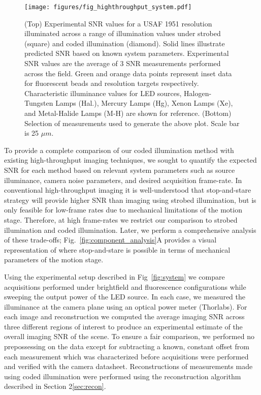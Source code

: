\begin{figure}
\centering
\texttt{[image: figures/fig\_highthroughput\_system.pdf]}
  \caption{\label{fig:experimental_comparison}(Top) Experimental SNR values for a USAF 1951 resolution illuminated across a range of illumination values under strobed (square) and coded illumination (diamond). Solid lines illustrate predicted SNR based on known system parameters. Experimental SNR values are the average of 3 SNR measurements performed across the field. Green and orange data points represent inset data for fluorescent beads and resolution targets respectively. Characteristic illuminance values for LED sources, Halogen-Tungsten Lamps (Hal.), Mercury Lamps (Hg), Xenon Lamps (Xe), and Metal-Halide Lamps (M-H) are shown for reference. (Bottom) Selection of measurements used to generate the above plot. Scale bar is 25 $\mu m$.}

\end{figure}

To provide a complete comparison of our coded illumination method with existing high-throughput imaging techniques, we sought to quantify the expected SNR for each method based on relevant system parameters such as source illuminance, camera noise parameters, and desired acquisition frame-rate. In conventional high-throughput imaging it is well-understood that stop-and-stare strategy will provide higher SNR than imaging using strobed illumination, but is only feasible for low-frame rates due to mechanical limitations of the motion stage. 
Therefore, at high frame-rates we restrict our comparison to strobed illumination and coded illumination. Later, we perform a comprehensive analysis of these trade-offs; Fig.~\ref{fig:component_analysis}A provides a visual representation of where stop-and-stare is possible in terms of mechanical parameters of the motion stage.

Using the experimental setup described in Fig~\ref{fig:system} we compare acquisitions performed under brightfield and fluorescence configurations while sweeping the output power of the LED source. In each case, we measured the illuminance at the camera plane using an optical power meter (Thorlabs). For each image and reconstruction we computed the average imaging SNR across three different regions of interest to produce an experimental estimate of the overall imaging SNR of the scene. To ensure a fair comparison, we performed no prepossessing on the data except for subtracting a known, constant offset from each measurement which was characterized before acquisitions were performed and verified with the camera datasheet. Reconstructions of measurements made using coded illumination were performed using the reconstruction algorithm described in Section 2\ref{sec:recon}. 

